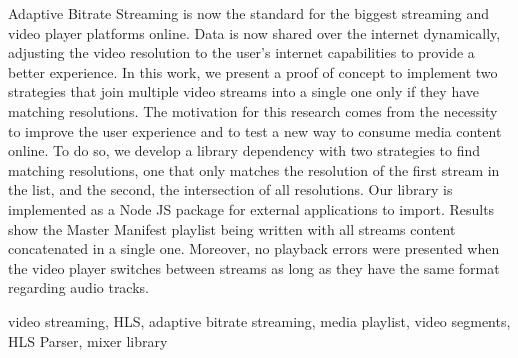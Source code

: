 Adaptive Bitrate Streaming is now the standard for the biggest streaming and video player platforms online. Data is now shared over the internet dynamically, adjusting the video resolution to the user's internet capabilities to provide a better experience. In this work, we present a proof of concept to implement two strategies that join multiple video streams into a single one only if they have matching resolutions. The motivation for this research comes from the necessity to improve the user experience and to test a new way to consume media content online. To do so, we develop a library dependency with two strategies to find matching resolutions, one that only matches the resolution of the first stream in the list, and the second, the intersection of all resolutions. Our library is implemented as a Node JS package for external applications to import. Results show the Master Manifest playlist being written with all streams content concatenated in a single one. Moreover, no playback errors were presented when the video player switches between streams as long as they have the same format regarding audio tracks. 




\begin{IEEEkeywords}
video streaming, HLS, adaptive bitrate streaming, media playlist, video segments, HLS Parser, mixer library

\end{IEEEkeywords}